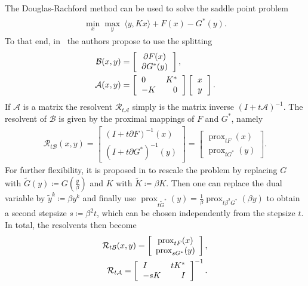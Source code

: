 \documentclass[twocolumn,envcountsame]{svjour3}
\newcommand{\MA}{\mathcal{A}}
\newcommand{\MB}{\mathcal{B}}
\newcommand{\MR}{\mathcal{R}}
\DeclareMathOperator{\prox}{prox}
\begin{document}
 The Douglas-Rachford method can be used to solve the saddle point problem
\begin{align}\label{eq:saddleprob}
\begin{split}
	\min_{x}\max_y\ \langle y, K x\rangle + F(x) - G^*(y).
\end{split}
\end{align}
To that end, in~\cite{oconnor2014primal} the authors propose to use the splitting
\begin{align}
  \label{split1}
  \begin{split}
  \MB(x,y)&=\left[\begin{tabular}{c}
    $\partial F(x)$\\
    $\partial G^*(y)$
  \end{tabular}\right],\\
  \MA(x,y)&=
  \left[\begin{tabular}{l r}
    $0$&$K^*$\\
    $-K$&$0$\end{tabular}\right]
    \left[\begin{tabular}{c}
    $x$\\
    $y$\end{tabular}\right].
  \end{split}
\end{align}
If $\MA$ is a matrix the resolvent $\MR_{t\MA}$ simply is the matrix inverse 
$(I+t\MA)^{-1}$. The resolvent of $\MB$ is given by the proximal
mappings of $F$ and $G^*$, namely
\begin{align*}
  \MR_{t\mathcal{B}}(x,y)=\left[\begin{array}{c}(I+t\partial F)^{-1}(x)\\ (I+t\partial
    G^*)^{-1}(y)\end{array}\right]=\left[\begin{array}{c}\prox_{tF}(x)\\\prox_{tG^*}(y)\end{array}\right].
\end{align*}
For further flexibility, it is proposed in \cite{oconnor2014primal} to rescale the problem by
replacing $G$ with $\tilde{G}(y)\coloneqq G(\frac{y}{\beta})$ and
$K$ with $\tilde{K}\coloneqq \beta K$. Then one can replace the dual variable by $\tilde{y}^k\coloneqq\beta
y^k$ and finally use
$\prox_{t\tilde{G}^*}(y)=\frac{1}{\beta}\prox_{t\beta^2G^*}(\beta y)$ to obtain a second
stepsize $s\coloneqq \beta^2 t$, which can be chosen independently from the stepsize $t$.
In total, the resolvents then become
\begin{align*} 
  \MR_{t\mathcal{B}}(x,y)=\left[\begin{array}{c}\prox_{tF}(x)\\\prox_{sG^*}(y)\end{array}\right],\\
    \MR_{t\MA}= \left[\begin{tabular}{l r}
    $I$&$tK^*$\\
    $-sK$&$I$\end{tabular}\right]^{-1}.
\end{align*}
\end{document}
